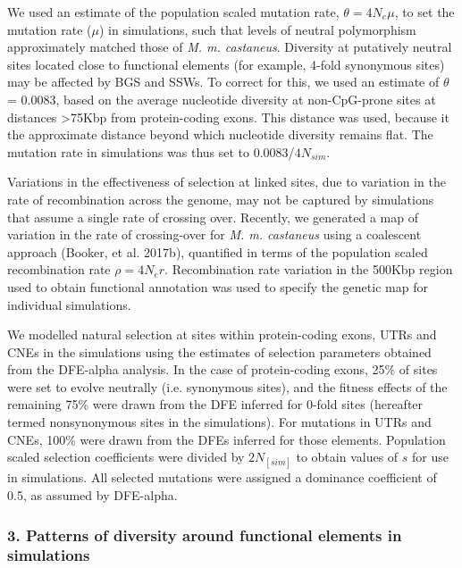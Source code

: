 	We used an estimate of the population scaled mutation rate, $\theta = 4N_e \mu$, to set the mutation rate ($\mu$) in simulations, such that levels of neutral polymorphism approximately matched those of \textit{M. m. castaneus}. Diversity at putatively neutral sites located close to functional elements (for example, 4-fold synonymous sites) may be affected by BGS and SSWs. To correct for this, we used an estimate of $\theta$ = 0.0083, based on the average nucleotide diversity at non-CpG-prone sites at distances >75Kbp from protein-coding exons. This distance was used, because it the approximate distance beyond which nucleotide diversity remains flat. The mutation rate in simulations was thus set to 0.0083/$4N_{sim}$. 

	Variations in the effectiveness of selection at linked sites, due to variation in the rate of recombination across the genome, may not be captured by simulations that assume a single rate of crossing over. Recently, we generated a map of variation in the rate of crossing-over for \textit{M. m. castaneus} using a coalescent approach (Booker, et al. 2017b), quantified in terms of the population scaled recombination rate $\rho = 4N_er$. Recombination rate variation in the 500Kbp region used to obtain functional annotation was used to specify the genetic map for individual simulations. 

	We modelled natural selection at sites within protein-coding exons, UTRs and CNEs in the simulations using the estimates of selection parameters obtained from the DFE-alpha analysis. In the case of protein-coding exons, 25\% of sites were set to evolve neutrally (i.e. synonymous sites), and the fitness effects of the remaining 75\% were drawn from the DFE inferred for 0-fold sites (hereafter termed nonsynonymous sites in the simulations). For mutations in UTRs and CNEs, 100\% were drawn from the DFEs inferred for those elements. Population scaled selection coefficients were divided by $2N_[sim]$ to obtain values of $s$ for use in simulations. All selected mutations were assigned a dominance coefficient of 0.5, as assumed by DFE-alpha.
 
\subsubsection{3. Patterns of diversity around functional elements in simulations}
 
